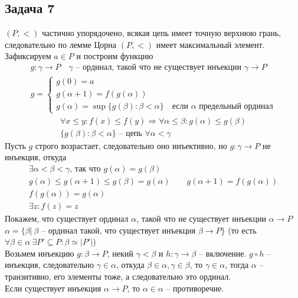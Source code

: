 \subsection*{Задача 7}
	$(P, <)$ частично упорядочено, всякая цепь имеет точную верхнюю грань, следовательно по лемме Цорна $(P,<)$ имеет максимальный элемент.\\
	Зафиксируем $a \in P$ и построим функцию
	\begin{gather*}
		g: \gamma \to P\quad \gamma\text{ -- ординал, такой что не существует инъекции } \gamma \to P\\
		g =
		\begin{cases}
			g(0) = a\\
			g(\alpha + 1) = f(g(\alpha))\\
			g(\alpha) = \sup \{g(\beta): \beta < \alpha\}\quad \text{если } \alpha \text{ предельный ординал}
		\end{cases}
	\end{gather*}
	\begin{gather*}
		\forall x \leqslant y: f(x) \leqslant f(y) \Rightarrow \forall \alpha \leqslant \beta: g(\alpha) \leqslant g(\beta)\\
		\{g(\beta): \beta < \alpha\} \text{ -- цепь } \forall \alpha < \gamma
	\end{gather*}
	Пусть $g$ строго возрастает, следовательно оно инъективно, но $g: \gamma \to P$ не инъекция, откуда
	\begin{gather*}
		\exists \alpha < \beta < \gamma \text{, так что } g(\alpha) = g(\beta)\\
		g(\alpha) \leqslant g(\alpha + 1) \leqslant g(\beta) = g(\alpha)\qquad g(\alpha + 1) = f(g(\alpha))\\
		f(g(\alpha)) = g(\alpha)\\
		\exists z: f(z) = z
	\end{gather*}
	Покажем, что существует ординал $\alpha$, такой что не существует инъекции $\alpha \to P$\\
	$\alpha = \{\beta|\ \beta \text{ -- ординал такой, что существует инъекция } \beta \to P\}$ (то есть $\forall \beta \in \alpha\ \exists P'\subseteq P: \beta \simeq |P'|$)\\
	Возьмем инъекцию $g: \beta \to P$, некий $\gamma < \beta$ и $h: \gamma \to \beta$ -- включение. $g \circ h$ -- инъекция, следовательно $\gamma \in \alpha$, откуда $\beta \in \alpha, \gamma \in \beta$, то $\gamma \in \alpha$, тогда $\alpha$ -- транзитивно, его элементы тоже, а следовательно это ординал.\\
	Если существует инъекция $\alpha \to P$, то $\alpha \in \alpha$ -- противоречие.


